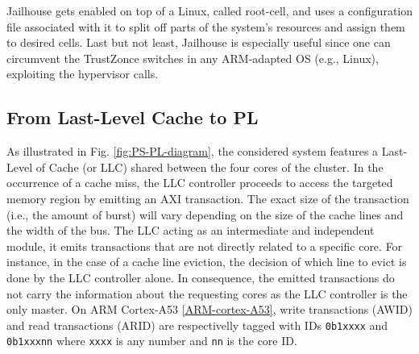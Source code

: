 Jailhouse gets enabled on top of a Linux, called root-cell, and uses a
configuration file associated with it to split off parts of the
system's resources and assign them to desired cells. Last but not
least, Jailhouse is especially useful since one can circumvent the
TrustZonce switches in any ARM-adapted OS (e.g., Linux), exploiting
the hypervisor calls.


\subsection{From Last-Level Cache to PL}
As illustrated in Fig. \ref{fig:PS-PL-diagram}, the considered system
features a Last-Level of Cache (or LLC) shared between the four cores
of the cluster. In the occurrence of a cache miss, the LLC controller
proceeds to access the targeted memory region by emitting an AXI
transaction. The exact size of the transaction (i.e., the amount of
burst) will vary depending on the size of the cache lines and the
width of the bus. The LLC acting as an intermediate and independent
module, it emits transactions that are not directly related to a
specific core. For instance, in the case of a cache line eviction, the
decision of which line to evict is done by the LLC controller
alone. In consequence, the emitted transactions do not carry the
information about the requesting cores as the LLC controller is the
only master. On ARM Cortex-A53 \ref{ARM-cortex-A53}, write
transactions (AWID) and read transactions (ARID) are respectivelly
tagged with IDs \verb|0b1xxxx| and \verb|0b1xxxnn| where \verb|xxxx|
is any number and \verb|nn| is the core ID.

